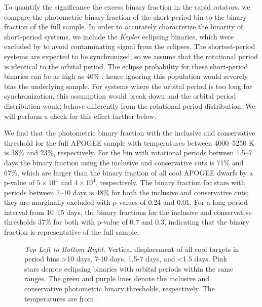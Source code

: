 \documentclass[manuscript]{aastex6}
\newcommand{\Kepler}{\mbox{\textit{Kepler}}}
\begin{document}
To quantify the significance the excess binary fraction in the rapid rotators, 
we compare the photometric binary fraction of the short-period bin to the
binary fraction of the full sample. In order to accurately characterize the 
binarity of short-period systems, we include the \Kepler{} eclipsing binaries, 
which were excluded by \citet{McQuillan14} to avoid contaminating signal from 
the eclipses. The shortest-period systems are expected to be synchronized, so
we assume that the rotational period is identical to the orbital period. 
The eclipse probability for these short-period binaries can be as high as 40\% 
\citep{Kirk16}, hence ignoring this population would severely
bias the underlying sample. For systems where the orbital period is too long
for synchronization, this assumption would break down and the orbital period
distribution would behave differently from the rotational period distribution.
We will perform a check for this effect further below.

We find that the photometric binary fraction with the inclusive and conservative 
threshold for the full APOGEE sample with temperatures between 4000--5250 K is 
38\% and 23\%, respectively. For the bin with rotational periods between 
1.5--7 days the binary fraction using the inclusive and conservative cuts is
71\% and 67\%, which are larger than the binary fraction of all cool APOGEE 
dwarfs by a p-value of \(5 \times 10^4\) and \(4 \times 10^4\), respectively. 
The binary fraction for stars with periods between 7--10 days is 48\% for both 
the inclusive and conservative cuts; they are marginally excluded with p-values
of 0.24 and 0.01. For a long-period interval from 10--15 days, the binary 
fractions for the inclusive and conservative thresholds 37\% for both with 
p-value of 0.7 and 0.3, indicating that the binary fraction is representative 
of the full sample.

\begin{figure*}[htb]
    \centering
    \caption{\emph{Top Left to Bottom Right:} Vertical displacement of all 
        cool \citet{McQuillan14} targets in period bins >10 days, 
        7-10 days, 1.5-7 days, and <1.5 days. Pink stars 
        denote eclipsing binaries with orbital periods within the same ranges. 
        The green and purple lines denote the inclusive and conservative 
    photometric binary thresholds, respectively. The temperatures are from
\citet{Pinsonneault12}.}\label{fig:mcq_rapid_excess}
\end{figure*}
\end{document}

